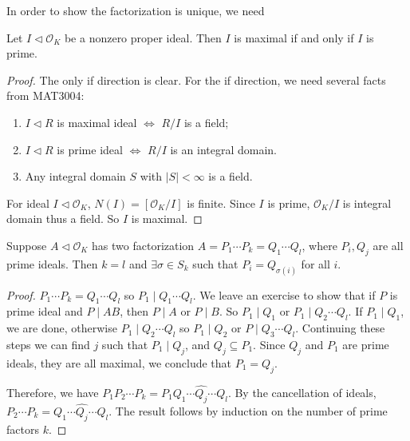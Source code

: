 In order to show the factorization is unique, we need 

\begin{lemma}
    Let $I\lhd \mathcal{O}_{K}$ be a nonzero proper ideal. Then $I$ is maximal if and only if $I$ is prime. 
\end{lemma}

\begin{proof}
    The only if direction is clear. For the if direction, we need several facts from MAT3004: 
    \begin{enumerate}
        \item $I\lhd R$ is maximal ideal $\iff$ $R /I$ is a field; 
        \item $I\lhd R$ is prime ideal $\iff$ $R /I$ is an integral domain. 
        \item Any integral domain $S$ with $\left| S \right| <\infty$ is a field. 
    \end{enumerate}
    For ideal $I\lhd\mathcal{O}_{K}$, $N(I)= [\mathcal{O}_{K} /I]$ is finite. Since $I$ is prime, $\mathcal{O}_{K} /I$ is integral domain thus a field.  So $I$ is maximal. 
\end{proof}

\begin{theorem}
    Suppose $A\lhd \mathcal{O}_{K}$ has two factorization $A=P_{1}\cdots P_{k}=Q_{1} \cdots Q_{l}$, where $P_{i}, Q_{j}$ are all prime ideals. Then $k=l$ and $\exists \sigma\in S_{k}$ such that $P_{i}=Q_{\sigma(i)}$ for all $i$. 
\end{theorem}

\begin{proof}
    $P_{1}\cdots P_{k}=Q_{1}\cdots Q_{l}$ so $P_{1}\mid Q_{1}\cdots Q_{l}$. We leave an exercise to show that if $P$ is prime ideal and $P\mid AB$, then $P\mid A$ or $P\mid B$. So $P_{1}\mid Q_{1}$ or $P_{1}\mid Q_{2}\cdots Q_{l}$. If $P_{1}\mid Q_{1}$, we are done, otherwise $P_{1}\mid Q_{2}\cdots Q_{l}$ so $P_{1}\mid Q_{2}$ or $P\mid Q_{3}\cdots Q_{l}$. Continuing these steps we can find $j$ such that $P_{1}\mid Q_{j}$, and $Q_{j}\subseteq P_{1}$. Since $Q_{j}$ and $P_{1}$ are prime ideals, they are all maximal, we conclude that $P_{1}=Q_{j}$. 

    Therefore, we have $P_{1}P_{2}\cdots P_{k}=P_{1}Q_{1}\cdots\hat{Q_{j}}\cdots Q_{l}$. By the cancellation of ideals, $P_{2}\cdots P_{k}=Q_{1}\cdots \hat{Q_{j}}\cdots Q_{l}$. The result follows by induction on the number of prime factors $k$. 
\end{proof}

